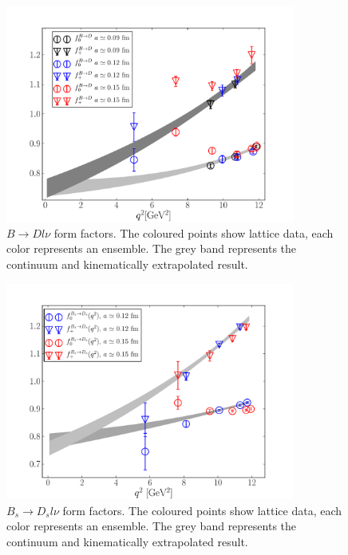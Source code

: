 \begin{figure}[htb!]
  \begin{center}
    \includegraphics[width=0.85\textwidth]{images/nrqcd/BD_formfactors.pdf}
  \end{center}
  \caption{$B\to Dl\nu$ form factors. The coloured points show lattice data, each color represents an ensemble. The grey band represents the continuum and kinematically extrapolated result. \label{fig:BD_formfactors}}
\end{figure}

\begin{figure}[htb!]
  \begin{center}
    \includegraphics[width=0.85\textwidth]{images/nrqcd/BsDs_formfactors.pdf}
  \end{center}
  \caption{$B_s\to D_sl\nu$ form factors. The coloured points show lattice data, each color represents an ensemble. The grey band represents the continuum and kinematically extrapolated result. \label{fig:BsDs_formfactors}}
\end{figure}

